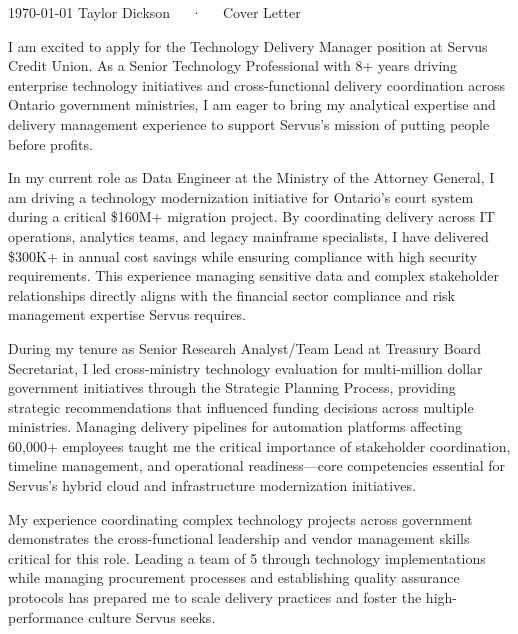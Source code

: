 \documentclass[11pt, letterpaper]{awesome-cv}
\begin{document}
\makecvheader[R]

\makecvfooter%
  {\today}
  {Taylor Dickson~~~·~~~Cover Letter}
  {}

\makelettertitle%

\begin{cvletter}
I am excited to apply for the Technology Delivery Manager position at Servus Credit Union. As a Senior Technology Professional with 8+ years driving enterprise technology initiatives and cross-functional delivery coordination across Ontario government ministries, I am eager to bring my analytical expertise and delivery management experience to support Servus's mission of putting people before profits.

In my current role as Data Engineer at the Ministry of the Attorney General, I am driving a technology modernization initiative for Ontario's court system during a critical \$160M+ migration project. By coordinating delivery across IT operations, analytics teams, and legacy mainframe specialists, I have delivered \$300K+ in annual cost savings while ensuring compliance with high security requirements. This experience managing sensitive data and complex stakeholder relationships directly aligns with the financial sector compliance and risk management expertise Servus requires.

During my tenure as Senior Research Analyst/Team Lead at Treasury Board Secretariat, I led cross-ministry technology evaluation for multi-million dollar government initiatives through the Strategic Planning Process, providing strategic recommendations that influenced funding decisions across multiple ministries. Managing delivery pipelines for automation platforms affecting 60,000+ employees taught me the critical importance of stakeholder coordination, timeline management, and operational readiness—core competencies essential for Servus's hybrid cloud and infrastructure modernization initiatives.

My experience coordinating complex technology projects across government demonstrates the cross-functional leadership and vendor management skills critical for this role. Leading a team of 5 through technology implementations while managing procurement processes and establishing quality assurance protocols has prepared me to scale delivery practices and foster the high-performance culture Servus seeks.


\end{cvletter}
\end{document}
